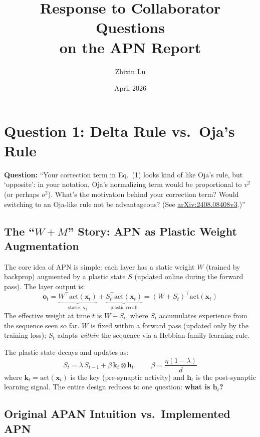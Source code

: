 \documentclass[11pt,a4paper]{article}
\title{Response to Collaborator Questions\\on the APN Report}
\author{Zhixin Lu}
\date{April 2026}
\begin{document}
\maketitle

\section{Question 1: Delta Rule vs.\ Oja's Rule}

\textbf{Question:} ``Your correction term in Eq.\ (1) looks kind of like Oja's rule, but `opposite': in your notation, Oja's normalizing term would be proportional to $v^2$ (or perhaps $o^2$). What's the motivation behind your correction term? Would switching to an Oja-like rule not be advantageous? (See \href{https://arxiv.org/abs/2408.08408v3}{arXiv:2408.08408v3}.)''

\subsection{The ``$W + M$'' Story: APN as Plastic Weight Augmentation}

The core idea of APN is simple: each layer has a static weight $W$ (trained by backprop) augmented by a plastic state $S$ (updated online during the forward pass).
The layer output is:
\begin{equation}\label{eq:output}
\mathbf{o}_t = \underbrace{W^\top \text{act}(\mathbf{x}_t)}_{\text{static: } \mathbf{v}_t} + \underbrace{S_t^\top \text{act}(\mathbf{x}_t)}_{\text{plastic recall}} = (W + S_t)^\top \text{act}(\mathbf{x}_t)
\end{equation}
The effective weight at time $t$ is $W + S_t$, where $S_t$ accumulates experience from the sequence seen so far.
$W$ is fixed within a forward pass (updated only by the training loss); $S_t$ adapts \emph{within} the sequence via a Hebbian-family learning rule.

The plastic state decays and updates as:
\begin{equation}\label{eq:update}
S_t = \lambda \, S_{t-1} + \beta \, \mathbf{k}_t \otimes \mathbf{h}_t, \qquad \beta = \frac{\eta(1-\lambda)}{d}
\end{equation}
where $\mathbf{k}_t = \text{act}(\mathbf{x}_t)$ is the key (pre-synaptic activity) and $\mathbf{h}_t$ is the post-synaptic learning signal.
The entire design reduces to one question: \textbf{what is $\mathbf{h}_t$?}

\subsection{Original APAN Intuition vs.\ Implemented APN}
\end{document}

